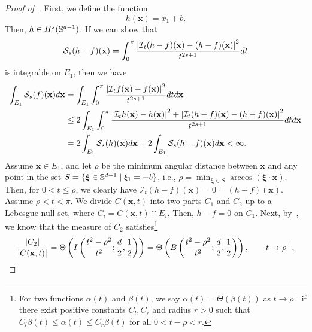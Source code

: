 \begin{proof}[Proof of~]
First, we define the function
\begin{equation*}
    h(\mathbf{x}) = x_1 + b.
\end{equation*}
Then, $h \in H^s({\mathbb{S}}^{d-1})$. If we can show that
\begin{equation*}
    \mathcal{S}_s(h-f)(\mathbf{x}) = \int_0^\pi \frac{\left|\mathcal{I}_t(h-f)(\mathbf{x}) - (h-f)(\mathbf{x})\right|^2}{t^{2s+1}} dt
\end{equation*}
is integrable on $E_1$, then we have
\begin{equation}\label{eq.E1integrable}
    \begin{aligned}
        \int_{E_1} \mathcal{S}_s(f)(\mathbf{x}) d\mathbf{x} & = \int_{E_1} \int_0^\pi \frac{\left|\mathcal{I}_tf(\mathbf{x}) - f(\mathbf{x})\right|^2}{t^{2s+1}} dt d\mathbf{x} \\
        &\leq 2\int_{E_1} \int_0^\pi \frac{\left|\mathcal{I}_th(\mathbf{x}) - h(\mathbf{x})\right|^2 + \left|\mathcal{I}_t(h-f)(\mathbf{x}) - (h-f)(\mathbf{x})\right|^2}{t^{2s+1}} dt d\mathbf{x} \\
        &= 2\int_{E_1} \mathcal{S}_s(h)(\mathbf{x}) d\mathbf{x} + 2\int_{E_1} \mathcal{S}_s(h-f)(\mathbf{x}) d\mathbf{x} < \infty.
    \end{aligned}
\end{equation}
Assume $\mathbf{x} \in E_1$, and let $\rho$ be the minimum angular distance between $\mathbf{x}$ and any point in the set $S = \{\boldsymbol{\xi} \in {\mathbb{S}}^{d-1} \mid \xi_1 = -b\}$, i.e., $\rho = \min_{\boldsymbol{\xi} \in S} \arccos(\boldsymbol{\xi} \cdot \mathbf{x})$. Then, for $0 < t \leq \rho$, we clearly have $\mathcal{I}_t(h-f)(\mathbf{x}) = 0 = (h-f)(\mathbf{x})$. Assume $\rho < t < \pi$. We divide $C(\mathbf{x},t)$ into two parts $C_1$ and $C_2$ up to a Lebesgue null set, where $C_i = C(\mathbf{x},t) \cap E_i$. Then, $h-f = 0$ on $C_1$. Next, by~\cite{Li2011}, we know that the measure of $C_2$ satisfies\footnote{For two functions $\alpha(t)$ and $\beta(t)$, we say $\alpha(t) = \Theta(\beta(t))$ as $t \rightarrow \rho^+$ if there exist positive constants $C_l, C_r$ and radius $r > 0$ such that $C_l \beta(t) \leq \alpha(t) \leq C_r \beta(t)$ for all $0 < t - \rho < r$.}
\begin{equation*}
\frac{\left|C_2\right|}{\left|C(\mathbf{x},t)\right|} = \Theta\left(I\left(\frac{t^2-\rho^2}{t^2}; \frac{d}{2}, \frac{1}{2}\right)\right) = \Theta\left(B\left(\frac{t^2-\rho^2}{t^2}; \frac{d}{2}, \frac{1}{2}\right)\right), \qquad t \rightarrow \rho^+,
\end{equation*}

\end{proof}
